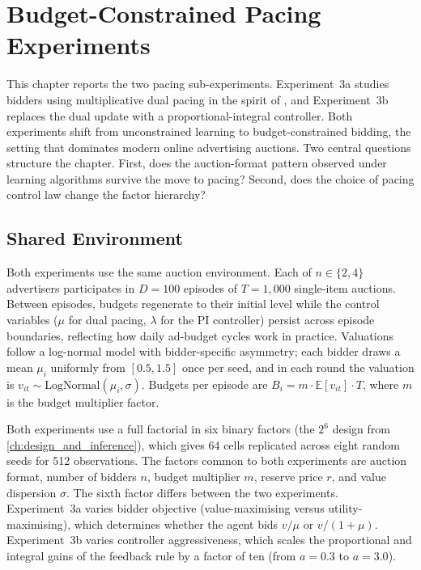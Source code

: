 \chapter{Budget-Constrained Pacing Experiments}
\label{ch:pacing}

This chapter reports the two pacing sub-experiments. Experiment~3a studies bidders using multiplicative dual pacing in the spirit of \citet{Balseiro2019Learning}, and Experiment~3b replaces the dual update with a proportional-integral controller. Both experiments shift from unconstrained learning to budget-constrained bidding, the setting that dominates modern online advertising auctions. Two central questions structure the chapter. First, does the auction-format pattern observed under learning algorithms survive the move to pacing? Second, does the choice of pacing control law change the factor hierarchy?

\section{Shared Environment}
\label{sec:pacing_env}

Both experiments use the same auction environment. Each of $n \in \{2, 4\}$ advertisers participates in $D = 100$ episodes of $T = 1{,}000$ single-item auctions. Between episodes, budgets regenerate to their initial level while the control variables ($\mu$ for dual pacing, $\lambda$ for the PI controller) persist across episode boundaries, reflecting how daily ad-budget cycles work in practice. Valuations follow a log-normal model with bidder-specific asymmetry; each bidder draws a mean $\mu_i$ uniformly from $[0.5, 1.5]$ once per seed, and in each round the valuation is $v_{it} \sim \mathrm{LogNormal}(\mu_i, \sigma)$. Budgets per episode are $B_i = m \cdot \mathbb{E}[v_{it}] \cdot T$, where $m$ is the budget multiplier factor.

Both experiments use a full factorial in six binary factors (the $2^6$ design from \cref{ch:design_and_inference}), which gives 64 cells replicated across eight random seeds for 512 observations. The factors common to both experiments are auction format, number of bidders $n$, budget multiplier $m$, reserve price $r$, and value dispersion $\sigma$. The sixth factor differs between the two experiments. Experiment~3a varies bidder objective (value-maximising versus utility-maximising), which determines whether the agent bids $v / \mu$ or $v / (1 + \mu)$. Experiment~3b varies controller aggressiveness, which scales the proportional and integral gains of the feedback rule by a factor of ten (from $a = 0.3$ to $a = 3.0$).

